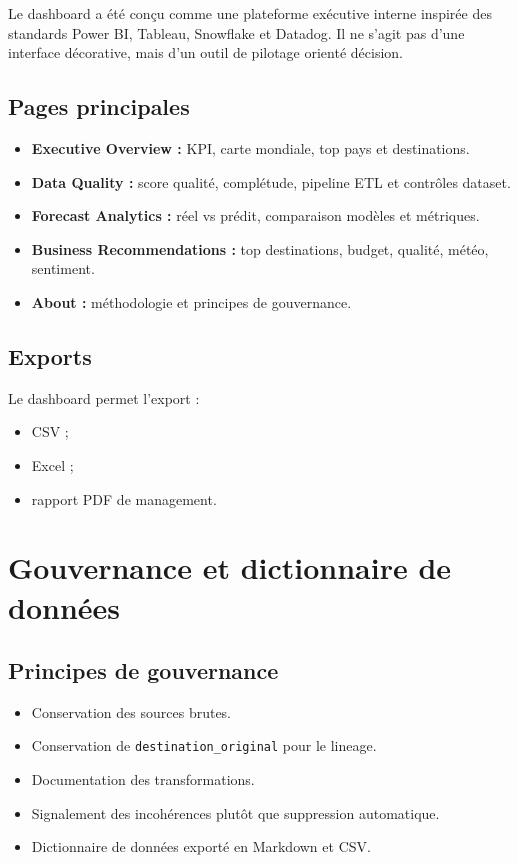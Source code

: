 \documentclass[11pt,a4paper]{report}
\begin{document}
Le dashboard a été conçu comme une plateforme exécutive interne inspirée des standards Power BI, Tableau, Snowflake et Datadog. Il ne s'agit pas d'une interface décorative, mais d'un outil de pilotage orienté décision.

\section{Pages principales}

\begin{itemize}[leftmargin=*]
    \item \textbf{Executive Overview :} KPI, carte mondiale, top pays et destinations.
    \item \textbf{Data Quality :} score qualité, complétude, pipeline ETL et contrôles dataset.
    \item \textbf{Forecast Analytics :} réel vs prédit, comparaison modèles et métriques.
    \item \textbf{Business Recommendations :} top destinations, budget, qualité, météo, sentiment.
    \item \textbf{About :} méthodologie et principes de gouvernance.
\end{itemize}

\section{Exports}

Le dashboard permet l'export :

\begin{itemize}[leftmargin=*]
    \item CSV ;
    \item Excel ;
    \item rapport PDF de management.
\end{itemize}

\chapter{Gouvernance et dictionnaire de données}

\section{Principes de gouvernance}

\begin{itemize}[leftmargin=*]
    \item Conservation des sources brutes.
    \item Conservation de \texttt{destination\_original} pour le lineage.
    \item Documentation des transformations.
    \item Signalement des incohérences plutôt que suppression automatique.
    \item Dictionnaire de données exporté en Markdown et CSV.
\end{itemize}
\end{document}
